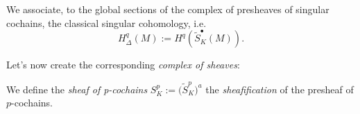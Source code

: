 \begin{defn}
	We associate, to the global sections of the complex of presheaves of singular cochains, the classical singular cohomology, i.e.
	\begin{equation}
		H^q_\Delta(M) := H^q(\widetilde{S}^\bullet_K(M))
	.\end{equation}
\end{defn}

Let's now create the corresponding \textit{complex of sheaves}:

\begin{defn}
	We define the \textit{sheaf of p-cochains} $S^p_K := \big( \widetilde{S}_K^p \big)^a$ the \textit{sheafification} of the presheaf of $p$-cochains.
\end{defn}

